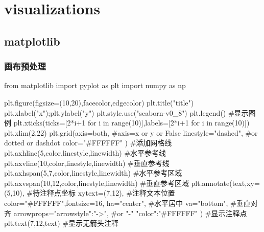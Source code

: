 \section{visualizations}

  \subsection{matplotlib}
    \subsubsection{画布预处理}
      \begin{codeblock}[language=python, caption={basic setup of plt}]
        from matplotlib import pyplot as plt
        import numpy as np

        plt.figure(figsize=(10,20),facecolor,edgecolor)
        plt.title("title")
        plt.xlabel("x");plt.ylabel("y")
        plt.style.use("seaborn-v0_8")
        plt.legend() #显示图例
        plt.xticks(ticks=[2*i+1 for i in range(10)],labels=[2*i+1 for i in range(10)])
        plt.xlim(2,22)
        plt.grid(axis=both, #axis=x or y or False
                linestyle="dashed", #or dotted or dashdot
                color="#FFFFFF"
        ) #添加网格线
        plt.axhline(5,color,linestyle,linewidth) #水平参考线
        plt.axvline(10,color,linestyle,linewidth) #垂直参考线
        plt.axhspan(5,7,color,linestyle,linewidth) #水平参考区域
        plt.axvspan(10,12,color,linestyle,linewidth) #垂直参考区域
        plt.annotate(text,xy=(5,10), #待注释点坐标
                    xytext=(7,12), #注释文本位置
                    color="#FFFFFF",fontsize=16,
                    ha="center", #水平居中
                    va="bottom", #垂直对齐
                    arrowprops={"arrowstyle":"->", #or "-"
                                "color":"#FFFFFF"}
        ) #显示注释点
        plt.text(7,12,text) #显示无箭头注释
      \end{codeblock}


